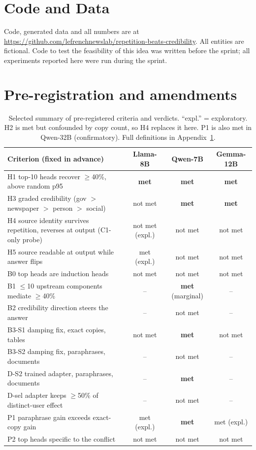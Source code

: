 \documentclass[11pt]{article}
\begin{document}
\section*{Code and Data}
Code, generated data and all numbers are at \url{https://github.com/lefrenchnewslab/repetition-beats-credibility}. All entities are fictional. Code to test the feasibility of this idea was written before the sprint; all experiments reported here were run during the sprint.





\appendix
\section{Pre-registration and amendments}\label{app:prereg}
\begin{table}[h]
\centering\small
\begin{tabular}{@{}p{6.6cm}ccc@{}}
\toprule
Criterion (fixed in advance) & Llama-8B & Qwen-7B & Gemma-12B \\
\midrule
H1 top-10 heads recover $\ge$40\%, above random p95 & \textbf{met} & \textbf{met} & \textbf{met} \\
H3 graded credibility (gov $>$ newspaper $>$ person $>$ social) & not met & \textbf{met} & \textbf{met} \\
H4 source identity survives repetition, reverses at output (C1-only probe) & not met (expl.) & not met & not met \\
H5 source readable at output while answer flips & met (expl.) & not met & not met \\
B0 top heads are induction heads & not met & not met & not met \\
B1 $\le$10 upstream components mediate $\ge$40\% & -- & \textbf{met} (marginal) & -- \\
B2 credibility direction steers the answer & -- & not met & -- \\
B3-S1 damping fix, exact copies, tables & not met & \textbf{met} & not met \\
B3-S2 damping fix, paraphrases, documents & -- & not met & -- \\
D-S2 trained adapter, paraphrases, documents & -- & \textbf{met} & -- \\
D-sel adapter keeps $\ge$50\% of distinct-user effect & -- & not met & -- \\
P1 paraphrase gain exceeds exact-copy gain & met (expl.) & \textbf{met} & met (expl.) \\
P2 top heads specific to the conflict & not met & not met & not met \\
\bottomrule
\end{tabular}
\caption{Selected summary of pre-registered criteria and verdicts. ``expl.'' = exploratory. H2 is met but confounded by copy count, so H4 replaces it here. P1 is also met in Qwen-32B (confirmatory). Full definitions in Appendix~\ref{app:prereg}.}
\label{tab:verdicts}
\end{table}

\end{document}
